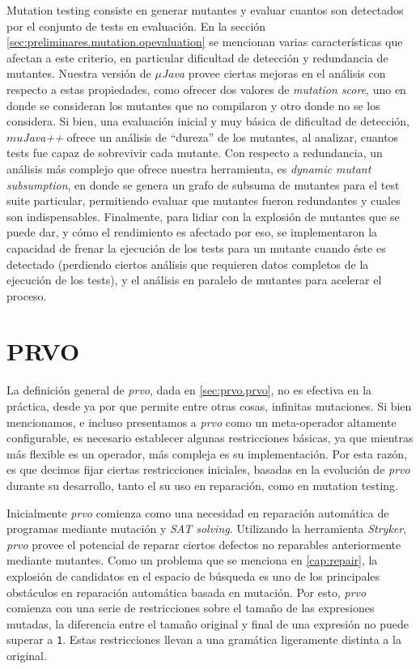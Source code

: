 Mutation testing consiste en generar mutantes y evaluar cuantos son detectados por el conjunto de tests en evaluaci\'on. En la secci\'on \ref{sec:preliminares.mutation.opevaluation} se mencionan varias caracter\'isticas que afectan a este criterio, en particular dificultad de detecci\'on y redundancia de mutantes. Nuestra versi\'on de \emph{$\mu$Java} provee ciertas mejoras en el an\'alisis con respecto a estas propiedades, como ofrecer dos valores de \emph{mutation score}, uno en donde se consideran los mutantes que no compilaron y otro donde no se los considera. Si bien, una evaluaci\'on inicial y muy b\'asica de dificultad de detecci\'on, \emph{$mu$Java++} ofrece un an\'alisis de ``dureza'' de los mutantes, al analizar, cuantos tests fue capaz de sobrevivir cada mutante. Con respecto a redundancia, un an\'alisis m\'as complejo que ofrece nuestra herramienta, es \emph{dynamic mutant subsumption}, en donde se genera un grafo de subsuma de mutantes para el test suite particular, permitiendo evaluar que mutantes fueron redundantes y cuales son indispensables. Finalmente, para lidiar con la explosi\'on de mutantes que se puede dar, y c\'omo el rendimiento es afectado por eso, se implementaron la capacidad de frenar la ejecuci\'on de los tests para un mutante cuando \'este es detectado (perdiendo ciertos an\'alisis que requieren datos completos de la ejecuci\'on de los tests), y el an\'alisis en paralelo de mutantes para acelerar el proceso.

\section{PRVO}
\label{sec:implementation.prvo}

La definici\'on general de \emph{prvo}, dada en \ref{sec:prvo.prvo}, no es efectiva en la pr\'actica, desde ya por que permite entre otras cosas, infinitas mutaciones. Si bien mencionamos, e incluso presentamos a \emph{prvo} como un meta-operador altamente configurable, es necesario establecer algunas restricciones b\'asicas, ya que mientras m\'as flexible es un operador, m\'as compleja es su implementaci\'on. Por esta raz\'on, es que decimos fijar ciertas restricciones iniciales, basadas en la evoluci\'on de \emph{prvo} durante su desarrollo, tanto el su uso en reparaci\'on, como en mutation testing.

Inicialmente \emph{prvo} comienza como una necesidad en reparaci\'on autom\'atica de programas mediante mutaci\'on y \emph{SAT solving}. Utilizando la herramienta \emph{Stryker}, \emph{prvo} provee el potencial de reparar ciertos defectos no reparables anteriormente mediante mutantes. Como un problema que se menciona en \ref{cap:repair}, la explosi\'on de candidatos en el espacio de b\'usqueda es uno de los principales obst\'aculos en reparaci\'on autom\'atica basada en mutaci\'on. Por esto, \emph{prvo} comienza con una serie de restricciones sobre el tama\~no de las expresiones mutadas, la diferencia entre el tama\~no original y final de una expresi\'on no puede superar a \texttt{1}. Estas restricciones llevan a una gram\'atica ligeramente distinta a la original.

